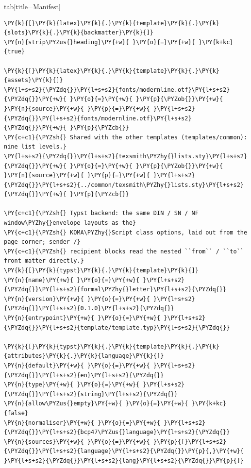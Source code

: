 \documentclass[a4paper,twoside]{article}
\begin{document}
\begin{tsdiv}{tab}[title=Manifest]
\begin{tscode}[lang=toml, engine=pygments]
\begin{Verbatim}[commandchars=\\\{\},breaklines, breakanywhere, commandchars=\\\{\}]
\PY{k}{[}\PY{k}{latex}\PY{k}{.}\PY{k}{template}\PY{k}{.}\PY{k}{slots}\PY{k}{.}\PY{k}{backmatter}\PY{k}{]}
\PY{n}{strip\PYZus{}heading}\PY{+w}{ }\PY{o}{=}\PY{+w}{ }\PY{k+kc}{true}

\PY{k}{[}\PY{k}{latex}\PY{k}{.}\PY{k}{template}\PY{k}{.}\PY{k}{assets}\PY{k}{]}
\PY{l+s+s2}{\PYZdq{}}\PY{l+s+s2}{fonts/modernline.otf}\PY{l+s+s2}{\PYZdq{}}\PY{+w}{ }\PY{o}{=}\PY{+w}{ }\PY{p}{\PYZob{}}\PY{+w}{ }\PY{n}{source}\PY{+w}{ }\PY{p}{=}\PY{+w}{ }\PY{l+s+s2}{\PYZdq{}}\PY{l+s+s2}{fonts/modernline.otf}\PY{l+s+s2}{\PYZdq{}}\PY{+w}{ }\PY{p}{\PYZcb{}}
\PY{c+c1}{\PYZsh{} Shared with the other templates (templates/common): nine list levels.}
\PY{l+s+s2}{\PYZdq{}}\PY{l+s+s2}{texsmith\PYZhy{}lists.sty}\PY{l+s+s2}{\PYZdq{}}\PY{+w}{ }\PY{o}{=}\PY{+w}{ }\PY{p}{\PYZob{}}\PY{+w}{ }\PY{n}{source}\PY{+w}{ }\PY{p}{=}\PY{+w}{ }\PY{l+s+s2}{\PYZdq{}}\PY{l+s+s2}{../common/texsmith\PYZhy{}lists.sty}\PY{l+s+s2}{\PYZdq{}}\PY{+w}{ }\PY{p}{\PYZcb{}}

\PY{c+c1}{\PYZsh{} Typst backend: the same DIN / SN / NF window\PYZhy{}envelope layouts as the}
\PY{c+c1}{\PYZsh{} KOMA\PYZhy{}Script class options, laid out from the page corner; sender /}
\PY{c+c1}{\PYZsh{} recipient blocks read the nested ``from`` / ``to`` front matter directly.}
\PY{k}{[}\PY{k}{typst}\PY{k}{.}\PY{k}{template}\PY{k}{]}
\PY{n}{name}\PY{+w}{ }\PY{o}{=}\PY{+w}{ }\PY{l+s+s2}{\PYZdq{}}\PY{l+s+s2}{formal\PYZhy{}letter}\PY{l+s+s2}{\PYZdq{}}
\PY{n}{version}\PY{+w}{ }\PY{o}{=}\PY{+w}{ }\PY{l+s+s2}{\PYZdq{}}\PY{l+s+s2}{0.1.0}\PY{l+s+s2}{\PYZdq{}}
\PY{n}{entrypoint}\PY{+w}{ }\PY{o}{=}\PY{+w}{ }\PY{l+s+s2}{\PYZdq{}}\PY{l+s+s2}{template/template.typ}\PY{l+s+s2}{\PYZdq{}}

\PY{k}{[}\PY{k}{typst}\PY{k}{.}\PY{k}{template}\PY{k}{.}\PY{k}{attributes}\PY{k}{.}\PY{k}{language}\PY{k}{]}
\PY{n}{default}\PY{+w}{ }\PY{o}{=}\PY{+w}{ }\PY{l+s+s2}{\PYZdq{}}\PY{l+s+s2}{en}\PY{l+s+s2}{\PYZdq{}}
\PY{n}{type}\PY{+w}{ }\PY{o}{=}\PY{+w}{ }\PY{l+s+s2}{\PYZdq{}}\PY{l+s+s2}{string}\PY{l+s+s2}{\PYZdq{}}
\PY{n}{allow\PYZus{}empty}\PY{+w}{ }\PY{o}{=}\PY{+w}{ }\PY{k+kc}{false}
\PY{n}{normaliser}\PY{+w}{ }\PY{o}{=}\PY{+w}{ }\PY{l+s+s2}{\PYZdq{}}\PY{l+s+s2}{bcp47\PYZus{}language}\PY{l+s+s2}{\PYZdq{}}
\PY{n}{sources}\PY{+w}{ }\PY{o}{=}\PY{+w}{ }\PY{p}{[}\PY{l+s+s2}{\PYZdq{}}\PY{l+s+s2}{language}\PY{l+s+s2}{\PYZdq{}}\PY{p}{,}\PY{+w}{ }\PY{l+s+s2}{\PYZdq{}}\PY{l+s+s2}{lang}\PY{l+s+s2}{\PYZdq{}}\PY{p}{]}


\end{Verbatim}
\end{tscode}
\end{tsdiv}
\end{document}
